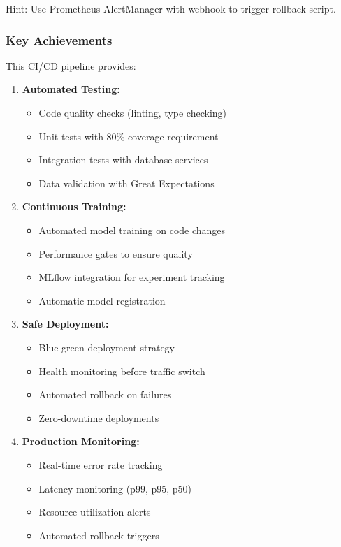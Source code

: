 Hint: Use Prometheus AlertManager with webhook to trigger rollback script.

\subsubsection*{Key Achievements}

This CI/CD pipeline provides:

\begin{enumerate}
    \item \textbf{Automated Testing:}
    \begin{itemize}
        \item Code quality checks (linting, type checking)
        \item Unit tests with 80\% coverage requirement
        \item Integration tests with database services
        \item Data validation with Great Expectations
    \end{itemize}

    \item \textbf{Continuous Training:}
    \begin{itemize}
        \item Automated model training on code changes
        \item Performance gates to ensure quality
        \item MLflow integration for experiment tracking
        \item Automatic model registration
    \end{itemize}

    \item \textbf{Safe Deployment:}
    \begin{itemize}
        \item Blue-green deployment strategy
        \item Health monitoring before traffic switch
        \item Automated rollback on failures
        \item Zero-downtime deployments
    \end{itemize}

    \item \textbf{Production Monitoring:}
    \begin{itemize}
        \item Real-time error rate tracking
        \item Latency monitoring (p99, p95, p50)
        \item Resource utilization alerts
        \item Automated rollback triggers
    \end{itemize}
\end{enumerate}

